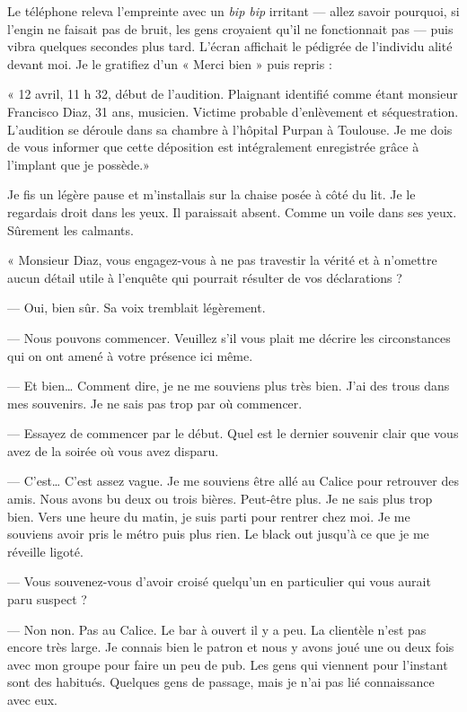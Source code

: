 Le téléphone releva l'empreinte avec un \emph{bip bip} irritant — allez savoir pourquoi, si l'engin ne faisait pas de
bruit, les gens croyaient qu'il ne fonctionnait pas — puis vibra quelques secondes plus tard. L'écran affichait le
pédigrée de l'individu alité devant moi. Je le gratifiez d'un « Merci bien » puis repris :

« 12 avril, 11 h 32, début de l'audition. Plaignant identifié comme étant monsieur Francisco Diaz, 31 ans, musicien.
Victime probable d'enlèvement et séquestration. L'audition se déroule dans sa chambre à l'hôpital Purpan à Toulouse. Je
me dois de vous informer que cette déposition est intégralement enregistrée grâce à l'implant que je possède.»

Je fis un légère pause et m'installais sur la chaise posée à côté du lit. Je le regardais droit dans les yeux. Il
paraissait absent. Comme un voile dans ses yeux. Sûrement les calmants.

« Monsieur Diaz, vous engagez-vous à ne pas travestir la vérité et à n'omettre aucun détail utile à l'enquête qui
pourrait résulter de vos déclarations ?

— Oui, bien sûr. Sa voix tremblait légèrement.

— Nous pouvons commencer. Veuillez s'il vous plait me décrire les circonstances qui on ont amené à votre présence ici
même.

— Et bien… Comment dire, je ne me souviens plus très bien. J'ai des trous dans mes souvenirs. Je ne sais pas trop par
où commencer.

— Essayez de commencer par le début. Quel est le dernier souvenir clair que vous avez de la soirée où vous avez disparu.

— C'est… C'est assez vague. Je me souviens être allé au Calice pour retrouver des amis. Nous avons bu deux ou trois
bières. Peut-être plus. Je ne sais plus trop bien. Vers une heure du matin, je suis parti pour rentrer chez moi. Je me
souviens avoir pris le métro puis plus rien. Le black out jusqu'à ce que je me réveille ligoté.

— Vous souvenez-vous d'avoir croisé quelqu'un en particulier qui vous aurait paru suspect ?

— Non non. Pas au Calice. Le bar à ouvert il y a peu. La clientèle n'est pas encore très large. Je connais bien le
patron et nous y avons joué une ou deux fois avec mon groupe pour faire un peu de pub. Les gens qui viennent pour
l'instant sont des habitués. Quelques gens de passage, mais je n'ai pas lié connaissance avec eux.

